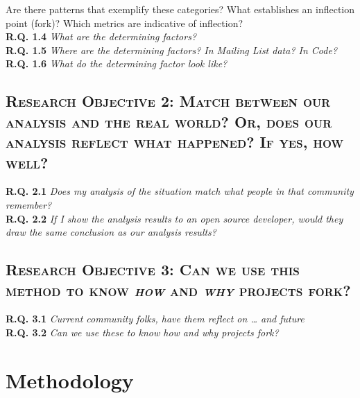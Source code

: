 \documentclass[conference]{IEEEtran}
\begin{document}
Are there patterns that exemplify these categories? What establishes an inflection point (fork)? Which metrics are indicative of inflection?\\

\textbf{R.Q. 1.4}  \textit{What are the determining factors?}\\

\textbf{R.Q. 1.5}  \textit{Where are the determining factors? In Mailing List data? In Code?}\\

\textbf{R.Q. 1.6}  \textit{What do the determining factor look like?}\\

\subsection*{\textsc{\textbf{Research Objective 2:} Match between our analysis and the real world? Or, does our analysis reflect what happened? If yes, how well?\\}}

\textbf{R.Q. 2.1}    \textit{Does my analysis of the situation match what people in that community remember?}\\ 

\textbf{R.Q. 2.2}    \textit{If I show the analysis results to an open source developer, would they draw the same conclusion as our analysis results?}

\subsection*{\textsc{\textbf{Research Objective 3:} Can we use this method to know \textit{how} and \textit{why} projects fork?}}

\textbf{R.Q. 3.1}    \textit{Current community folks, have them reflect on … and future}\\

\textbf{R.Q. 3.2}    \textit{Can we use these to know \textit{how} and \textit{why} projects fork?}\\


%


\section{Methodology}
\label{methodology}
\end{document}
